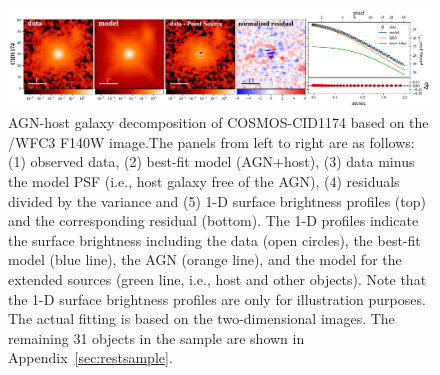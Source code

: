 \documentclass[apj]{emulateapj}
\begin{document}


\begin{figure}
\centering
{
\includegraphics[height=0.25\textwidth]{fig/best_fit_CID1174_SB_profile.pdf}
\caption{\label{fig:AGN_decomp} AGN-host galaxy decomposition of COSMOS-CID1174 based on the \hst/WFC3 F140W image.The panels from left to right are as follows: (1) observed data, (2) best-fit model (AGN+host), (3) data minus the model PSF (i.e., host galaxy free of the AGN), (4) residuals divided by the variance and (5) 1-D surface brightness profiles (top) and the corresponding residual (bottom). The 1-D profiles indicate the surface brightness including the data (open circles), the best-fit model (blue line), the AGN (orange line), and the model for the extended sources (green line, i.e., host and other objects). Note that the 1-D surface brightness profiles are only for illustration purposes. The actual fitting is based on the two-dimensional images. The remaining 31 objects in the sample are shown in Appendix~\ref{sec:restsample}.
}}
\end{figure} 
\end{document}

